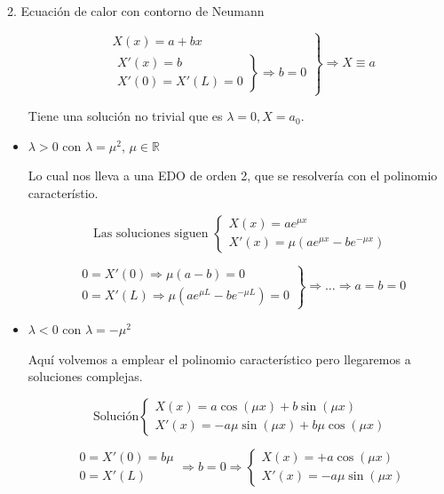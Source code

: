 \begin{example}{2. Ecuación de calor con contorno de Neumann}
\begin{itemize}
				\[ \left.
				\begin{array}{l}
					X(x) = a + bx \\
					\left.
					\begin{array}{r}
						X'(x) = b \\
						X'(0) = X'(L) = 0
					\end{array} \right\} \Rightarrow b = 0
				\end{array} \right\} \Rightarrow X \equiv a \]

				Tiene una solución no trivial que es $\lambda = 0, X=a_0$.

			\item $\lambda > 0$ con $\lambda = \mu^2$, $\mu \in \mathbb{R}$

				Lo cual nos lleva a una EDO de orden 2, que se resolvería con el polinomio característio.

				\[ \text{Las soluciones siguen } \left\{
				   \begin{array}{l}
				   	X(x) = a e^{\mu x} \\
				   	X'(x) = \mu (ae^{\mu x} - be^{-\mu x})
				   \end{array} \right.
				\]

				\[ \left. \begin{array}{l}
					0 = X'(0) \Rightarrow \mu(a - b) = 0 \\
					0 = X'(L) \Rightarrow \mu(a e^{\mu L} - b e^{-\mu L}) = 0
				\end{array} \right\}
					\Rightarrow … \Rightarrow a = b = 0
				\]


			\item $\lambda < 0$ con $\lambda = - \mu^2$

				Aquí volvemos a emplear el polinomio característico pero llegaremos a soluciones complejas.

			 	\[ \text{Solución} \left\{
				   \begin{array}{l}
				   	X(x) = a \cos(\mu x ) + b \sin( \mu x) \\
				   	X'(x) = -a \mu \sin(\mu x) + b \mu \cos(\mu x)
				   \end{array} \right.
				\]

			 	\[
			 		\begin{array}{l}
			 		0 = X'(0) = b \mu \\
			 		0 = X'(L)
			 		\end{array} \Rightarrow b = 0 \Rightarrow \left\{ \begin{array}{l}
			 			X(x) = + a \cos (\mu x ) \\
			 			X'(x) = -a \mu \sin (\mu x)
			 		\end{array} \right.
			 	\]


\end{itemize}
\end{example}
